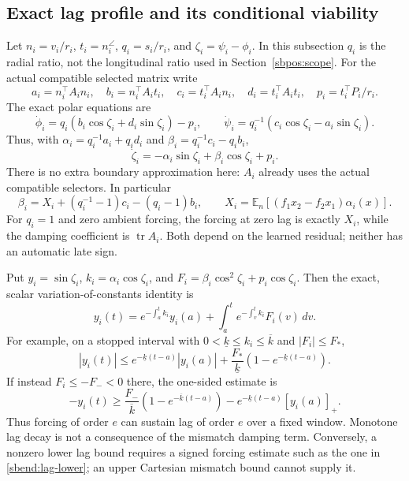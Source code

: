 \documentclass[11pt]{article}
\theoremstyle{remark}
\begin{document}
\subsection{Exact lag profile and its conditional viability}

Let $n_i=v_i/r_i$, $t_i=n_i^\angle$, $q_i=s_i/r_i$, and
$\zeta_i=\psi_i-\phi_i$. In this subsection $q_i$ is the radial ratio,
not the longitudinal ratio used in Section~\ref{sbpos:scope}.
For the actual compatible selected matrix write
\[
 a_i=n_i^\top A_i n_i,\quad b_i=n_i^\top A_i t_i,\quad
 c_i=t_i^\top A_i n_i,\quad d_i=t_i^\top A_i t_i,\quad
 p_i=t_i^\top P_i/r_i.
\]
The exact polar equations are
\[
 \dot\phi_i=q_i(b_i\cos\zeta_i+d_i\sin\zeta_i)-p_i,\qquad
 \dot\psi_i=q_i^{-1}(c_i\cos\zeta_i-a_i\sin\zeta_i).
\]
Thus, with
$\alpha_i=q_i^{-1}a_i+q_id_i$ and
$\beta_i=q_i^{-1}c_i-q_ib_i$,
\begin{equation}\label{sbend:lag-exact}
 \dot\zeta_i=-\alpha_i\sin\zeta_i+\beta_i\cos\zeta_i+p_i.
\end{equation}
There is no extra boundary approximation here: $A_i$ already uses the
actual compatible selectors. In particular
\begin{equation}\label{sbend:lag-skew}
 \beta_i=X_i+(q_i^{-1}-1)c_i-(q_i-1)b_i,\qquad
 X_i=\mathbb E_n[(f_1x_2-f_2x_1)\alpha_i(x)].
\end{equation}
For $q_i=1$ and zero ambient forcing, the forcing at zero lag is
exactly $X_i$, while the damping coefficient is $\operatorname{tr}A_i$.
Both depend on the learned residual; neither has an automatic late sign.

Put $y_i=\sin\zeta_i$, $k_i=\alpha_i\cos\zeta_i$, and
$F_i=\beta_i\cos^2\zeta_i+p_i\cos\zeta_i$. Then the exact, scalar
variation-of-constants identity is
\begin{equation}\label{sbend:lag-profile}
 y_i(t)=e^{-\int_a^t k_i}y_i(a)
             +\int_a^t e^{-\int_v^t k_i}F_i(v)\,dv.
\end{equation}
For example, on a stopped interval with
$0<\underline k\le k_i\le\overline k$ and $|F_i|\le F_*$,
\[
 |y_i(t)|\le e^{-\underline k(t-a)}|y_i(a)|
       +\frac{F_*}{\underline k}(1-e^{-\underline k(t-a)}).
\]
If instead $F_i\le-F_-<0$ there, the one-sided estimate is
\begin{equation}\label{sbend:lag-lower}
 -y_i(t)\ge
 \frac{F_-}{\overline k}(1-e^{-\overline k(t-a)})
                 -e^{-\underline k(t-a)}[y_i(a)]_+.
\end{equation}
Thus forcing of order $e$ can sustain lag of order $e$ over a fixed
window. Monotone lag decay is not a consequence of the mismatch damping
term. Conversely, a nonzero lower lag bound requires a signed forcing
estimate such as the one in \eqref{sbend:lag-lower}; an upper Cartesian
mismatch bound cannot supply it.
\end{document}
